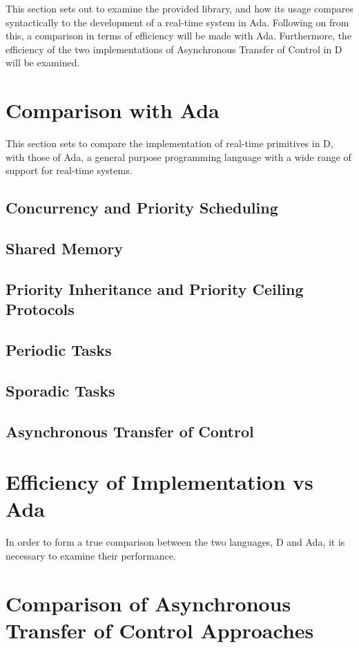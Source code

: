 
This section sets out to examine the provided library, and how its usage
compares syntactically to the development of a real-time system in Ada. 
Following on from
this, a comparison in terms of efficiency will be made with Ada. Furthermore,
the efficiency of the two implementations of Asynchronous Transfer of Control in 
D will be examined. 

\section{Comparison with Ada}

This section sets to compare the implementation of real-time primitives in D,
with those of Ada, a general purpose programming language with a wide range of
support for real-time systems.

\subsection{Concurrency and Priority Scheduling}

\subsection{Shared Memory}

\subsection{Priority Inheritance and Priority Ceiling Protocols}

\subsection{Periodic Tasks}

\subsection{Sporadic Tasks}

\subsection{Asynchronous Transfer of Control}

\section{Efficiency of Implementation vs Ada}
In order to form a true comparison between the two languages, D and Ada, it is
necessary to examine their performance.

\section{Comparison of Asynchronous Transfer of Control Approaches}
